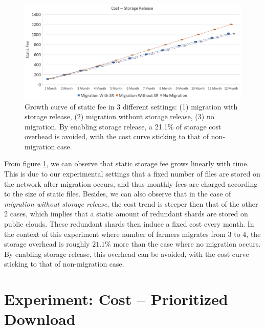 \begin{figure}[hbt]
  \centering
    \includegraphics[width=14cm]{charts/chart_cost_storage_release.png}
    \caption[Growth curve of static fee in 3 different settings: (1) migration with storage release, (2) migration without storage release, (3) no migration]{Growth curve of static fee in 3 different settings: (1) migration with storage release, (2) migration without storage release, (3) no migration. By enabling storage release, a 21.1\% of storage cost overhead is avoided, with the cost curve sticking to that of non-migration case.}
    \label{fig:coststoragerelease}
\end{figure}

From figure \ref{fig:coststoragerelease}, we can observe that static storage fee grows linearly with time. This is due to our experimental settings that a fixed number of files are stored on the network after migration occurs, and thus monthly fees are charged according to the size of static files. Besides, we can also observe that in the case of \textit{migration without storage release}, the cost trend is steeper then that of the other 2 cases, which implies that a static amount of redundant shards are stored on public clouds. These redundant shards then induce a fixed cost every month. In the context of this experiment where number of farmers migrates from 3 to 4, the storage overhead is roughly $21.1\%$ more than the case where no migration occurs. By enabling storage release, this overhead can be avoided, with the cost curve sticking to that of non-migration case.

\section{Experiment: Cost -- Prioritized Download}
\label{s:expcostprioritizeddownload}

